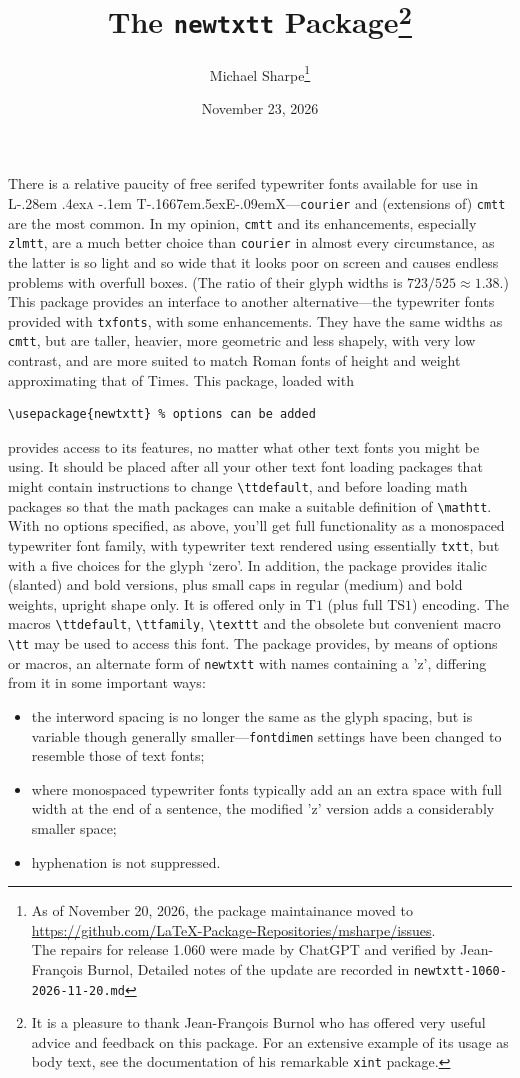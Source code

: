\documentclass[11pt]{article}
\title{The \texttt{newtxtt} Package\thanks{It is a pleasure to thank Jean-Fran\c{c}ois Burnol who has offered very useful advice and feedback on this package. For an extensive example of its usage as body text, see  the documentation of his remarkable {\tt xint} package.}
}
\author{Michael Sharpe\thanks{As of November 20, 2026, the package
maintainance moved to\\\url{https://github.com/LaTeX-Package-Repositories/msharpe/issues}.\\
The repairs for release 1.060 were made by ChatGPT and verified by Jean-Fran\c{c}ois Burnol,
Detailed notes of the update are recorded in \texttt{newtxtt-1060-2026-11-20.md}}%
}
\date{November 23, 2026}  %
\makeatletter
\def\TeX{T\kern-.1667em\lower.5ex\hbox{E}\kern-.09emX\@}
\DeclareRobustCommand{\LaTeX}{L\kern-.28em%
\raise.4ex\hbox{\textsc{a}}%
        \kern-.1em%
        \TeX}
\makeatother
\begin{document}
\maketitle
There is a relative paucity of free serifed typewriter fonts available for use  in \LaTeX---{\tt courier}
 and (extensions of) {\tt cmtt} are the most common.  In my opinion, {\tt cmtt} and its enhancements, especially {\tt zlmtt}, are a much better choice than {\tt courier} in almost every circumstance, as the latter is so light and so wide that it looks poor on screen and causes endless problems with overfull boxes. (The ratio of their glyph widths is $723/525\approx1.38$.) This package provides an interface to another alternative---the typewriter fonts provided with {\tt txfonts}, with some enhancements. They have the same widths as {\tt cmtt}, but are taller, heavier, more geometric and less shapely, with  very low contrast, and are more suited to match Roman fonts of height and weight approximating that of Times. This package, loaded with
\begin{verbatim}
\usepackage{newtxtt} % options can be added
\end{verbatim}
provides access to its features, no matter what other text fonts you might be using. It should be placed after all your other text font loading packages that might contain instructions to change \verb|\ttdefault|, and before loading math packages so that the math packages can make a suitable definition of \verb|\mathtt|. With no options specified, as above, you'll get full functionality as a monospaced typewriter font family, with typewriter text rendered using essentially {\tt txtt}, but with a five choices for the glyph  `zero'. In addition, the package  provides italic (slanted) and bold versions, plus small caps in regular (medium) and bold weights, upright shape only. It is offered  only in T$1$ (plus full TS$1$) encoding. The macros \verb|\ttdefault|, \verb|\ttfamily|, \verb|\texttt| and the obsolete but convenient macro \verb|\tt| may be used to access this font. 
 The package provides, by means of options or macros, an alternate form of {\tt newtxtt} with names containing a {\ttz 'z'}, differing from it in some important ways:
 \begin{itemize}
 \item 
 the interword spacing is no longer the same as the glyph spacing, but is variable though generally smaller---{\tt fontdimen} settings have been changed to resemble those of text fonts;
 \item
where monospaced typewriter fonts typically add an an extra space with full width at the end of a sentence, the modified {\ttz 'z'} version adds a considerably smaller space;
 \item
 hyphenation is not suppressed.
 \end{itemize}
\end{document}
